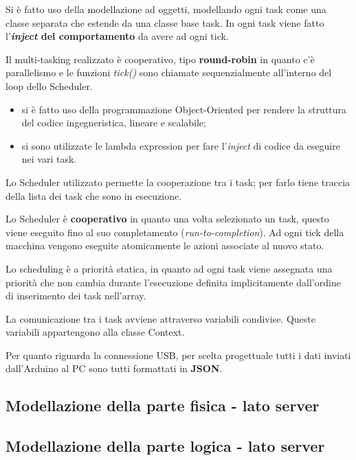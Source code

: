 Si è fatto uso della modellazione ad oggetti, modellando ogni task come una classe separata che estende da una classe base task. In ogni task viene fatto l'\textbf{\textit{inject} del comportamento} da avere ad ogni tick.

Il multi-tasking realizzato è cooperativo, tipo \textbf{round-robin} in quanto c'è parallelismo e le funzioni \textit{tick()} sono chiamate sequenzialmente all'interno del loop dello Scheduler.

\begin{itemize}	
	\item si è fatto uso della programmazione Object-Oriented per rendere la struttura del codice ingegneristica, lineare e scalabile;
	\item si sono utilizzate le lambda expression per fare l'\textit{inject} di codice da eseguire nei vari task.
\end{itemize}

Lo Scheduler utilizzato permette la cooperazione tra i task; per farlo tiene traccia della lista dei task che sono in esecuzione.

Lo Scheduler è \textbf{cooperativo} in quanto una volta selezionato un task, questo viene eseguito fino al suo completamento (\textit{run-to-completion}). Ad ogni tick della macchina vengono eseguite atomicamente le azioni associate al nuovo stato.

Lo scheduling è a priorità statica, in quanto ad ogni task viene assegnata una priorità che non cambia durante l'esecuzione definita implicitamente dall'ordine di inserimento dei task nell'array.

La comunicazione tra i task avviene attraverso variabili condivise. Queste variabili appartengono alla classe Context.

Per quanto riguarda la connessione USB, per scelta progettuale tutti i dati inviati dall'Arduino al PC sono tutti formattati in \textbf{JSON}.

\subsection{Modellazione della parte fisica - lato server}
\subsection{Modellazione della parte logica - lato server}
